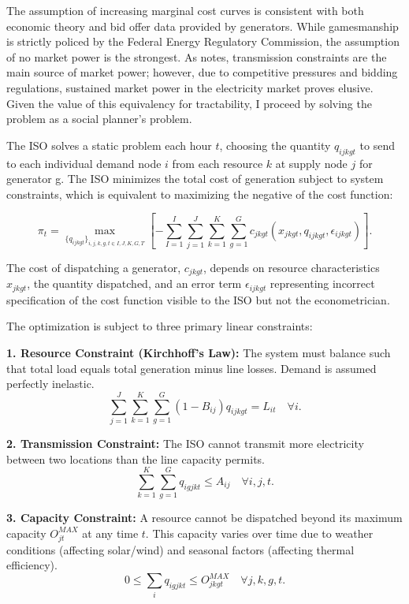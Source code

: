 \documentclass[12pt]{article}
\begin{document}
The assumption of increasing marginal cost curves is consistent with both economic theory and bid offer data provided by generators. While gamesmanship is strictly policed by the Federal Energy Regulatory Commission, the assumption of no market power is the strongest. As \cite{gilbert2004allocating} notes, transmission constraints are the main source of market power; however, due to competitive pressures and bidding regulations, sustained market power in the electricity market proves elusive. Given the value of this equivalency for tractability, I proceed by solving the problem as a social planner's problem.

The ISO solves a static problem each hour $t$, choosing the quantity $q_{ijkgt}$ to send to each individual demand node $i$ from each resource $k$ at supply node $j$ for generator g. The ISO minimizes the total cost of generation subject to system constraints, which is equivalent to maximizing the negative of the cost function:

\begin{equation} \pi_{t}=\max_{\{q_{ijkgt}\}_{i,j,k,g,t\in I,J,K,G,T}} \left[- \sum_{I=1}^I \sum_{j=1}^J \sum_{k=1}^K \sum_{g=1}^G c_{jkgt}(x_{jkgt},q_{ijkgt},\epsilon_{ijkgt})\right]. \end{equation}

The cost of dispatching a generator, $c_{jkgt}$, depends on resource characteristics $x_{jkgt}$, the quantity dispatched, and an error term $\epsilon_{ijkgt}$ representing incorrect specification of the cost function visible to the ISO but not the econometrician.

The optimization is subject to three primary linear constraints:

\textbf{1. Resource Constraint (Kirchhoff's Law):} The system must balance such that total load equals total generation minus line losses. Demand is assumed perfectly inelastic. \begin{equation} \label{Budget_Constraint} \sum_{j=1}^J\sum_{k=1}^K \sum_{g=1}^G (1-B_{ij})q_{ijkgt}=L_{it} \quad \forall i. \end{equation}

\textbf{2. Transmission Constraint:} The ISO cannot transmit more electricity between two locations than the line capacity permits. \begin{equation} \sum_{k=1}^K \sum_{g=1}^G q_{igjkt}\leq A_{ij} \quad \forall i,j,t. \end{equation}

\textbf{3. Capacity Constraint:}
A resource cannot be dispatched beyond its maximum capacity $O_{jt}^{MAX}$ at any time $t$. This capacity varies over time due to weather conditions (affecting solar/wind) and seasonal factors (affecting thermal efficiency).
\begin{equation}
0\leq \sum_{i} q_{igjkt}\leq O_{jkgt}^{MAX} \quad \forall j,k,g,t.
\end{equation}
\end{document}
